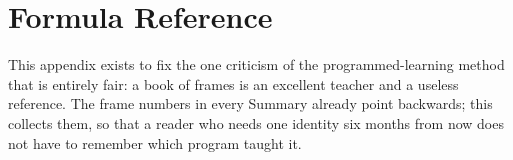 %
%
%

\chapter{Formula Reference}
\label{app:C}

\noindent
This appendix exists to fix the one criticism of the programmed-learning
method that is entirely fair: a book of frames is an excellent teacher and a
useless reference. The frame numbers in every Summary already point backwards;
this collects them, so that a reader who needs one identity six months from now
does not have to remember which program taught it.

\medskip
\resultsbody
